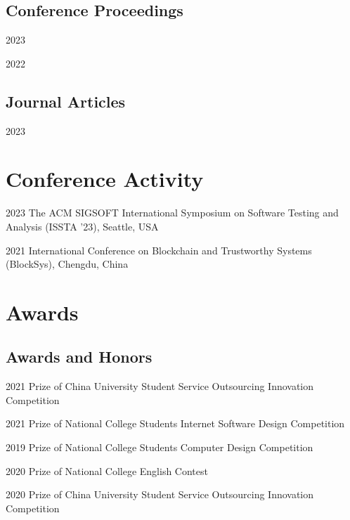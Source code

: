 \documentclass[12pt,letterpaper]{report}
\begin{document}
    \subsection*{Conference Proceedings}
    \begin{tablist}
        \item[2023] \tab{}
        \item[2022] \tab{}
    \end{tablist}

    \subsection*{Journal Articles}
    \begin{tablist}
        \item[2023] \tab{}
    \end{tablist}


    \section*{Conference Activity}
    \begin{tablist}
        \item[2023] \tab{}The ACM SIGSOFT International Symposium on Software Testing and Analysis (ISSTA '23), Seattle, USA
        \item[2021] \tab{}International Conference on Blockchain and Trustworthy Systems (BlockSys), Chengdu, China
    \end{tablist}

    \section*{Awards}
    \subsection*{Awards and Honors}
    \begin{tablist}
        \item[2021] \tab{} Prize of China University Student Service Outsourcing Innovation Competition
        \item[2021] \tab{} Prize of National College Students Internet Software Design Competition
        \item[2019] \tab{} Prize of National College Students Computer Design Competition
        \item[2020] \tab{} Prize of National College English Contest
        \item[2020] \tab{} Prize of China University Student Service Outsourcing Innovation Competition
    \end{tablist}
\end{document}
